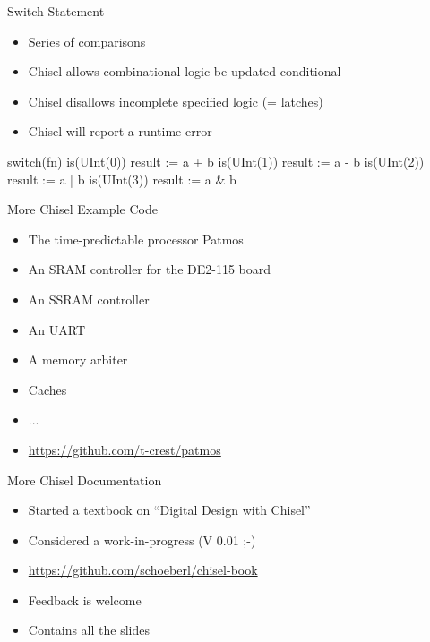 \documentclass[xcolor=pdflatex,dvipsnames,table]{beamer}
\begin{document}
\begin{frame}[fragile]{Switch Statement}
\begin{itemize}
\item Series of comparisons
\item Chisel allows combinational logic be updated conditional 
\item Chisel disallows incomplete specified logic (= latches)
\item Chisel will report a runtime error
\end{itemize}
\begin{chisel}
switch(fn) {
  is(UInt(0)) { result := a + b }
  is(UInt(1)) { result := a - b }
  is(UInt(2)) { result := a | b }
  is(UInt(3)) { result := a & b }
}
\end{chisel}
\end{frame}

\begin{frame}[fragile]{More Chisel Example Code}
\begin{itemize}
\item The time-predictable processor Patmos
\item An SRAM controller for the DE2-115 board
\item An SSRAM controller
\item An UART
\item A memory arbiter
\item Caches
\item ...
\item \url{https://github.com/t-crest/patmos}
\end{itemize}
\end{frame}


\begin{frame}[fragile]{More Chisel Documentation}
\begin{itemize}
\item Started a textbook on ``Digital Design with Chisel''
\item Considered a work-in-progress (V 0.01 ;-)
\item \url{https://github.com/schoeberl/chisel-book}
\item Feedback is welcome
\item Contains all the slides
\end{itemize}
\end{frame}
\end{document}
